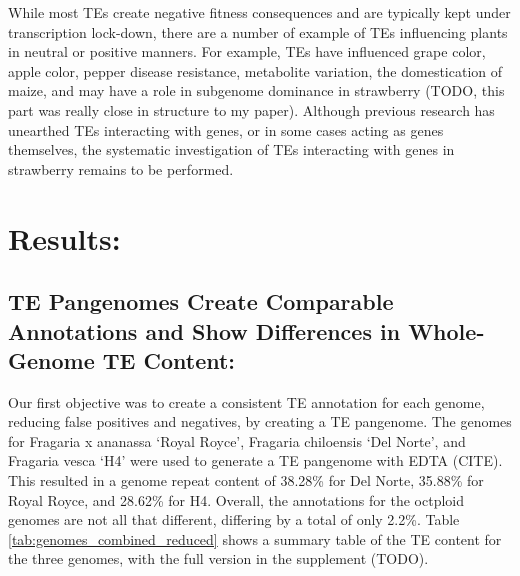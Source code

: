 \documentclass[fleqn,10pt]{olplainarticle}
\begin{document}
While most TEs create negative fitness consequences and are typically kept under transcription lock-down, there are a number of example of TEs influencing plants in neutral or positive manners.
For example, TEs have influenced grape color, apple color, pepper disease resistance, metabolite variation, the domestication of maize, and may have a role in subgenome dominance in strawberry (TODO, this part was really close in structure to my paper).
Although previous research has unearthed TEs interacting with genes, or in some cases acting as genes themselves, the systematic investigation of TEs interacting with genes in strawberry remains to be performed.






\section{Results:}
\subsection{TE Pangenomes Create Comparable Annotations and Show Differences in Whole-Genome TE Content:}
Our first objective was to create a consistent TE annotation for each genome, reducing false positives and negatives, by creating a TE pangenome.
The genomes for Fragaria x ananassa `Royal Royce', Fragaria chiloensis `Del Norte', and Fragaria vesca `H4' were used to generate a TE pangenome with EDTA (CITE).
This resulted in a genome repeat content of 38.28\% for Del Norte, 35.88\% for Royal Royce, and 28.62\% for H4.
Overall, the annotations for the octploid genomes are not all that different, differing by a total of only 2.2\%.
Table \ref{tab:genomes_combined_reduced} shows a summary table of the TE content for the three genomes, with the full version in the supplement (TODO).
\end{document}
